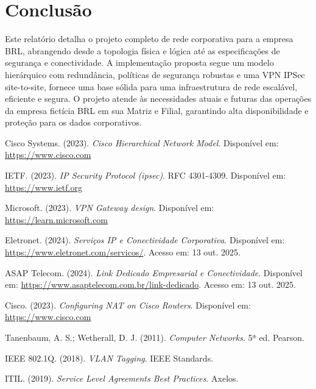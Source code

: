 \documentclass[a4paper, 12pt]{article}
\begin{document}
\section{Conclusão}
\label{sec:conclusao}

Este relatório detalha o projeto completo de rede corporativa para a empresa BRL, abrangendo desde a topologia física e lógica até as especificações de segurança e conectividade. A implementação proposta segue um modelo hierárquico com redundância, políticas de segurança robustas e uma VPN IPSec site-to-site, fornece uma base sólida para uma infraestrutura de rede escalável, eficiente e segura. O projeto atende às necessidades atuais e futuras das operações da empresa fictícia BRL em sua Matriz e Filial, garantindo alta disponibilidade e proteção para os dados corporativos.

\begin{thebibliography}{9}

Cisco Systems. (2023). \emph{Cisco Hierarchical Network Model}.
Disponível em: \url{https://www.cisco.com}

IETF. (2023). \emph{IP Security Protocol (ipsec)}. RFC 4301-4309.
Disponível em: \url{https://www.ietf.org}

Microsoft. (2023). \emph{VPN Gateway design}.
Disponível em: \url{https://learn.microsoft.com}

Eletronet. (2024). \emph{Serviços IP e Conectividade Corporativa}.
Disponível em: \url{https://www.eletronet.com/servicos/}. Acesso em: 13 out. 2025.

ASAP Telecom. (2024). \emph{Link Dedicado Empresarial e Conectividade}.
Disponível em: \url{https://www.asaptelecom.com.br/link-dedicado}. Acesso em: 13 out. 2025.

Cisco. (2023). \emph{Configuring NAT on Cisco Routers}.
Disponível em: \url{https://www.cisco.com}

Tanenbaum, A. S.; Wetherall, D. J. (2011). \emph{Computer Networks}. 5ª ed. Pearson.

IEEE 802.1Q. (2018). \emph{VLAN Tagging}. IEEE Standards.

ITIL. (2019). \emph{Service Level Agreements Best Practices}. Axelos.

\end{thebibliography}
\end{document}
